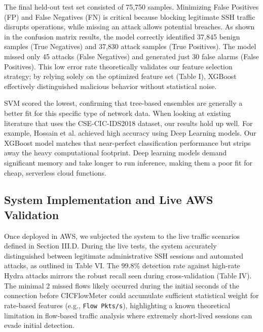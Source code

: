 \documentclass[conference]{IEEEtran}
\begin{document}
The final held-out test set consisted of 75,750 samples. Minimizing False Positives (FP) and False Negatives (FN) is critical because blocking legitimate SSH traffic disrupts operations, while missing an attack allows potential breaches. As shown in the confusion matrix results, the model correctly identified 37,845 benign samples (True Negatives) and 37,830 attack samples (True Positives). The model missed only 45 attacks (False Negatives) and generated just 30 false alarms (False Positives). This low error rate theoretically validates our feature selection strategy; by relying solely on the optimized feature set (Table I), XGBoost effectively distinguished malicious behavior without statistical noise.

SVM scored the lowest, confirming that tree-based ensembles are generally a better fit for this specific type of network data. When looking at existing literature that uses the CSE-CIC-IDS2018 dataset, our results hold up well. For example, Hossain et al. \cite{b4} achieved high accuracy using Deep Learning models. Our XGBoost model matches that near-perfect classification performance but strips away the heavy computational footprint. Deep learning models demand significant memory and take longer to run inference, making them a poor fit for cheap, serverless cloud functions.

\subsection{System Implementation and Live AWS Validation}

Once deployed in AWS, we subjected the system to the live traffic scenarios defined in Section III.D. During the live tests, the system accurately distinguished between legitimate administrative SSH sessions and automated attacks, as outlined in Table VI. The 99.8\% detection rate against high-rate Hydra attacks mirrors the robust recall seen during cross-validation (Table IV). The minimal 2 missed flows likely occurred during the initial seconds of the connection before CICFlowMeter could accumulate sufficient statistical weight for rate-based features (e.g., \texttt{Flow Pkts/s}), highlighting a known theoretical limitation in flow-based traffic analysis where extremely short-lived sessions can evade initial detection.
\end{document}
